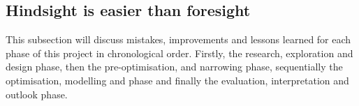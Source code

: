 \subsection{Hindsight is easier than foresight}
This subsection will discuss mistakes, improvements and lessons learned for each phase of this project in chronological order. 
Firstly, the research, exploration and design phase, then the pre-optimisation,  and narrowing phase, sequentially the optimisation, modelling and   phase and finally the evaluation, interpretation and outlook phase. 
